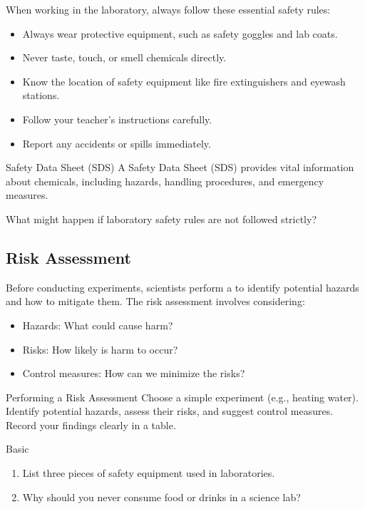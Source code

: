 When working in the laboratory, always follow these essential safety rules:

\begin{itemize}
    \item Always wear protective equipment, such as safety goggles and lab coats.
    \item Never taste, touch, or smell chemicals directly.
    \item Know the location of safety equipment like fire extinguishers and eyewash stations.
    \item Follow your teacher's instructions carefully.
    \item Report any accidents or spills immediately.
\end{itemize}

\begin{keyconcept}{Safety Data Sheet (SDS)}
A Safety Data Sheet (SDS) provides vital information about chemicals, including hazards, handling procedures, and emergency measures.
\end{keyconcept}

\begin{stopandthink}
What might happen if laboratory safety rules are not followed strictly?
\end{stopandthink}

\subsection{Risk Assessment}

Before conducting experiments, scientists perform a  to identify potential hazards and how to mitigate them. The risk assessment involves considering:

\begin{itemize}
    \item Hazards: What could cause harm?
    \item Risks: How likely is harm to occur?
    \item Control measures: How can we minimize the risks?
\end{itemize}

\begin{investigation}{Performing a Risk Assessment}
Choose a simple experiment (e.g., heating water). Identify potential hazards, assess their risks, and suggest control measures. Record your findings clearly in a table.
\end{investigation}

\begin{tieredquestions}{Basic}
\begin{enumerate}
    \item List three pieces of safety equipment used in laboratories.
    \item Why should you never consume food or drinks in a science lab?
\end{enumerate}
\end{tieredquestions}

